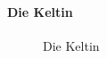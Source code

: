 \documentclass[
  letterpaper,
  DIV=11,
  numbers=noendperiod,
  landscape,
  a4paper,
  geometry:margin=1in]{scrartcl}
\let\oldparagraph\paragraph
\renewcommand{\paragraph}[1]{\oldparagraph{#1}\mbox{}}
\begin{document}
\paragraph{Die Keltin}\label{die-keltin}

\begin{figure}


\caption{\label{fig-die-keltin}Die Keltin}

\end{figure}%
\end{document}
